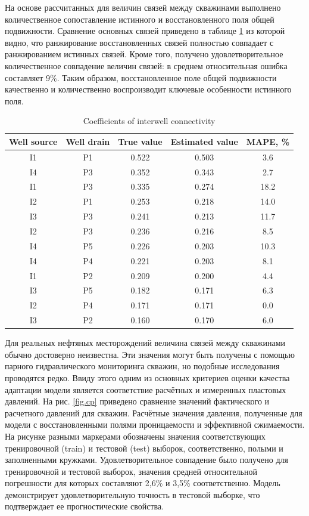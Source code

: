 \documentclass{article}
\begin{document}
 На основе рассчитанных для величин связей между скважинами выполнено количественное сопоставление истинного и восстановленного поля общей подвижности. Сравнение основных связей приведено в таблице \ref{tabl:connection} из которой видно, что ранжирование восстановленных связей полностью совпадает с ранжированием истинных связей. Кроме того, получено удовлетворительное количественное совпадение величин связей: в среднем относительная ошибка составляет 9\%. Таким образом, восстановленное поле общей подвижности качественно и количественно воспроизводит ключевые особенности истинного поля.

\begin{table}[h!]
	\caption{Coefficients of interwell connectivity}	
	\label{tabl:connection}	
	\begin{center}
		\begin{tabular}{c|c|c|c|c}
			\hline
			Well source &  Well drain & True value & Estimated  value & MAPE, \% \\
			\hline
			I1 & P1 & 0.522 & 0.503 & 3.6 \\
			I4 & P3 & 0.352 & 0.343 & 2.7 \\
			I1 & P3 & 0.335 & 0.274 & 18.2 \\
			I2 & P1 & 0.253 & 0.218 & 14.0 \\
			I3 & P3 & 0.241 & 0.213 & 11.7 \\
			I2 & P3 & 0.236 & 0.216 & 8.5 \\
			I4 & P5 & 0.226 & 0.203 & 10.3 \\
			I4 & P4 & 0.221 & 0.203 & 8.1 \\
			I1 & P2 & 0.209 & 0.200 & 4.4 \\
			I3 & P5 & 0.182 & 0.171 & 6.3 \\
			I2 & P4 & 0.171 & 0.171 & 0.0 \\
			I3 & P2 & 0.160 & 0.170 & 6.0 \\
			\hline
			
		\end{tabular}
	\end{center}
\end{table}

Для реальных нефтяных месторождений величина связей между скважинами обычно достоверно неизвестна. Эти значения могут быть получены с помощью парного гидравлического мониторинга скважин, но подобные исследования проводятся редко. Ввиду этого одним из основных критериев оценки качества адаптации модели является соответствие расчётных и измеренных пластовых давлений. На рис. \ref{fig.cp} приведено сравнение значений фактического и расчетного давлений для скважин. Расчётные значения давления, полученные для модели с восстановленными полями проницаемости и эффективной сжимаемости. На рисунке разными маркерами обозначены значения соответствующих тренировочной (train) и тестовой (test) выборок, соответственно, полыми и заполненными кружками. Удовлетворительное совпадение было получено для тренировочной и тестовой выборок, значения средней относительной погрешности для которых составляют 2,6\% и 3,5\% соответственно. Модель демонстрирует удовлетворительную точность в тестовой выборке, что подтверждает ее прогностические свойства.
\end{document}
